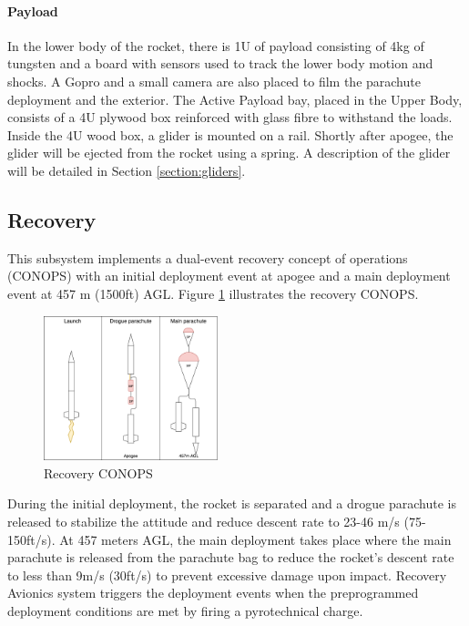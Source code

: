 \paragraph{Payload}
\hfill \break
In the lower body of the rocket, there is 1U of payload 
consisting of 4kg of tungsten and a board with sensors used to track the lower body motion and shocks. A Gopro and a small camera are also placed to film the parachute deployment and the exterior.
The Active Payload bay, placed in the Upper Body, consists of a 4U plywood box reinforced with glass fibre to withstand the loads. Inside the 4U wood box, a glider is mounted on a rail. Shortly after apogee, the glider will be ejected from the rocket using a spring. A  description of the glider will be detailed in Section \ref{section:gliders}.




\subsection{Recovery}
This subsystem implements a dual-event recovery concept of operations (CONOPS) with an initial deployment event at apogee and a main deployment event at 457 m (1500ft) AGL. Figure \ref{f:recovery_conops} illustrates the recovery CONOPS.
\begin{figure}[h!]
 	\centering
        \includegraphics[width=0.45\textwidth]{img/recovery_conops_schema.png}
        \caption{Recovery CONOPS}
        \label{f:recovery_conops}
 \end{figure}

During the initial deployment, the rocket is separated and a drogue parachute is released to stabilize the attitude and reduce descent rate to 23-46 m/s (75-150ft/s). At 457 meters AGL, the main deployment takes place where the main parachute is released from the parachute bag to reduce the rocket's descent rate to less than 9m/s (30ft/s) to prevent excessive damage upon impact. Recovery Avionics system triggers the deployment events when the preprogrammed deployment conditions are met by firing a pyrotechnical charge.

